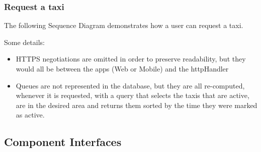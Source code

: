 \documentclass{article}
\begin{document}
	\subsubsection{Request a taxi}
	The following Sequence Diagram demonstrates how a user can request a taxi.
	\begin{figure}[H]
	\end{figure}
	Some details:
	\begin{itemize}
		\item HTTPS negotiations are omitted in order to preserve readability, but they would all be between the apps (Web or Mobile) and the httpHandler %
		\item Queues are not represented in the database, but they are all re-computed, whenever it is requested, with a query that selects the taxis that are active, are in the desired area and returns them sorted by the time they were marked as active.
	\end{itemize}
	\subsection{Component Interfaces}
\end{document}
